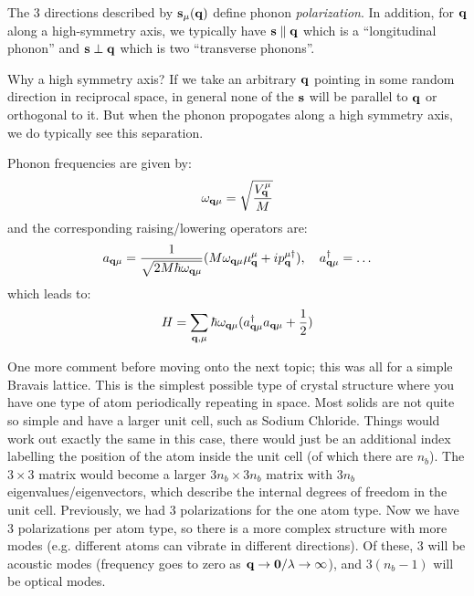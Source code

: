 The 3 directions described by $\mathbf{s}_\mu(\mathbf{q})$ define phonon \emph{polarization}. In addition, for $\mathbf{q}$ along a high-symmetry axis, we typically have $\mathbf{s} \parallel \mathbf{q}$ which is a ``longitudinal phonon'' and $\mathbf{s} \perp \mathbf{q}$ which is two ``transverse phonons''.

Why a high symmetry axis? If we take an arbitrary $\mathbf{q}$ pointing in some random direction in reciprocal space, in general none of the $\mathbf{s}$ will be parallel to $\mathbf{q}$ or orthogonal to it. But when the phonon propogates along a high symmetry axis, we do typically see this separation.

Phonon frequencies are given by:
\begin{equation}
    \omega_{\mathbf{q}\mu} = \sqrt{\frac{V_{\mathbf{q}}^\mu}{M}}
\end{equation}
and the corresponding raising/lowering operators are:
\begin{equation}
    a_{\mathbf{q}\mu} = \frac{1}{\sqrt{2M\hbar \omega_{\mathbf{q}\mu}}}(M\omega_{\mathbf{q}\mu}\mu^\mu_{\mathbf{q}} + ip_{\mathbf{q}}^{\mu\dagger}), \quad a_{\mathbf{q}\mu}^\dagger = \ldots
\end{equation}
which leads to:
\begin{equation}
    H = \sum_{\mathbf{q}, \mu}\hbar \omega_{\mathbf{q}\mu}(a^{\dagger}_{\mathbf{q}\mu}a_{\mathbf{q}\mu} + \frac{1}{2})
\end{equation}

One more comment before moving onto the next topic; this was all for a simple Bravais lattice. This is the simplest possible type of crystal structure where you have one type of atom periodically repeating in space. Most solids are not quite so simple and have a larger unit cell, such as Sodium Chloride. Things would work out exactly the same in this case, there would just be an additional index labelling the position of the atom inside the unit cell (of which there are $n_b$). The $3 \times 3$ matrix would become a larger $3n_b \times 3n_b$ matrix with $3n_b$ eigenvalues/eigenvectors, which describe the internal degrees of freedom in the unit cell. Previously, we had 3 polarizations for the one atom type. Now we have 3 polarizations per atom type, so there is a more complex structure with more modes (e.g. different atoms can vibrate in different directions). Of these, 3 will be acoustic modes (frequency goes to zero as $\mathbf{q} \to \mathbf{0}/\lambda \to \infty$), and $3(n_b - 1)$ will be optical modes.

